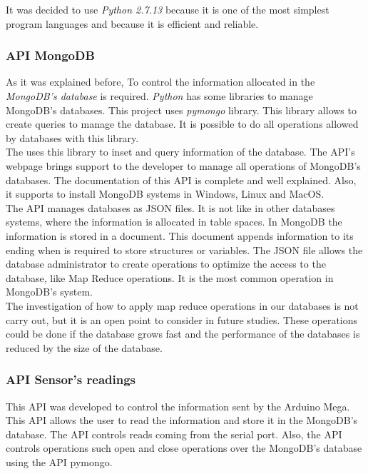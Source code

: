 It was decided to use \textit{Python 2.7.13} because it is one of the most simplest program languages and because it is efficient and reliable.

\subsubsection{API MongoDB}

As it was explained before, To control the information allocated in the \textit{MongoDB's database} is required. \textit{Python} has some libraries to manage MongoDB's databases. This project uses \textit{pymongo} library. This library allows to create queries to manage the database. It is possible to do all operations allowed by databases with this library.\\

The uses this library to inset and query information of the database. The API's webpage brings support to the developer to manage all operations of MongoDB's databases. The documentation of this API is complete and well explained. Also, it supports to install MongoDB systems in Windows, Linux and MacOS.\\

The API manages databases as JSON files. It is not like in other databases systems, where the information is allocated in table spaces. In MongoDB the information is stored in a document. This document appends information to its ending when is required to store structures or variables. The JSON file allows the database administrator to create operations to optimize the access to the database, like Map Reduce operations. It is the most common operation in MongoDB's system.\\

The investigation of how to apply map reduce operations in our databases is not carry out, but it is an open point to consider in future studies. These operations could be done if the database grows fast and the performance of the databases is reduced by the size of the database.

\subsubsection{API Sensor's readings}

This API was developed to control the information sent by the Arduino Mega. This API allows the user to read the information and store it in the MongoDB's database. The API controls reads coming from the serial port. Also, the API controls operations such open and close operations over the MongoDB's database using the API pymongo.\\


